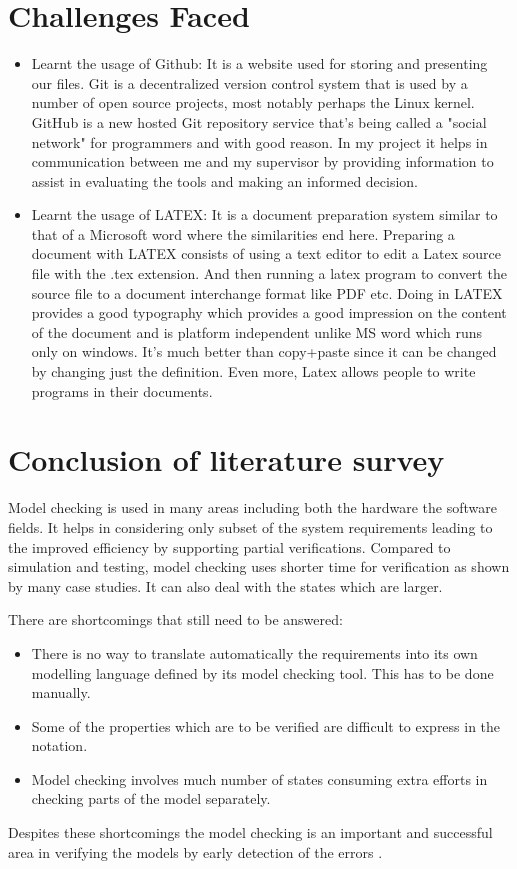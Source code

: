 \documentclass[a4paper,12pt]{extarticle}
\begin{document}
{\section{Challenges Faced}
\label{Challenges faced}
\onehalfspacing
\begin{itemize}
\item Learnt the usage of Github: It is a website used for storing and presenting our files. Git is a decentralized version control system that is used by a number of open source projects, most notably perhaps the Linux kernel. GitHub is a new hosted Git repository service that's being called a "social network" for programmers and with good reason. In my project it helps in communication between me and my supervisor by providing information to assist in evaluating the tools and making an informed decision.
\item Learnt the usage of LATEX: It is a document preparation system similar to that of a Microsoft word where the similarities end here. Preparing a document with LATEX consists of using a text editor to edit a Latex source file with the .tex extension. And then running a latex program to convert the source file to a document interchange format like PDF etc. Doing in LATEX provides a good typography which provides a good impression on the content of the document and is platform independent unlike MS word which runs only on windows. It's much better than copy+paste since it can be changed by changing just the definition. Even more, Latex allows people to write programs in their documents. 
\end{itemize}
\section{Conclusion of literature survey}
\label{conclude literature survey}
\onehalfspacing
Model checking is used in many areas including both the hardware the software fields. It helps in considering only subset of the system requirements leading to the improved efficiency by supporting partial verifications\cite{Palshikar2004}. Compared to simulation and testing, model checking uses shorter time for verification as shown by many case studies. It can also deal with the states which are larger. \cite{Palshikar2004}

There are shortcomings that still need to be answered:
\begin{itemize}
\item 	There is no way to translate automatically the requirements into its own modelling language defined by its model checking tool. This has to be done manually.
\item 	Some of the properties which are to be verified are difficult to express in the notation.
\item Model checking involves much number of states consuming extra efforts in checking parts of the model separately. 
\end{itemize}
Despites these shortcomings the model checking is an important and successful area in verifying the models by early detection of the errors \cite{Havelund}.
}
\end{document}

